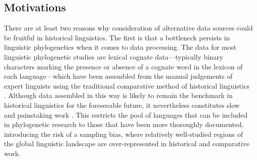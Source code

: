 \hypertarget{phy-sig-motiv}{%
\subsection{Motivations}\label{phy-sig-motiv}}

There are at least two reasons why consideration of alternative data sources could be fruitful in historical linguistics. The first is that a bottleneck persists in linguistic phylogenetics when it comes to data processing. The data for most linguistic phylogenetic studies are lexical cognate data---typically binary characters marking the presence or absence of a cognate word in the lexicon of each language---which have been assembled from the manual judgements of expert linguists using the traditional comparative method of historical linguistics \autocite[e.g.,][]{weiss_comparative_2014}. Although data assembled in this way is likely to remain the benchmark in historical linguistics for the foreseeable future, it nevertheless constitutes slow and painstaking work \autocites[notwithstanding efforts to automate parts of the process; see][]{list_potential_2017}{rama_are_2018}{list_sequence_2018}. This restricts the pool of languages that can be included in phylogenetic research to those that have been more thoroughly documented, introducing the risk of a sampling bias, where relatively well-studied regions of the global linguistic landscape are over-represented in historical and comparative work.

